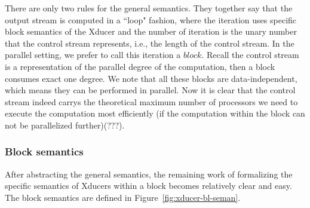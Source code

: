 There are only two rules for the general semantics. 
They together say that the output stream is computed in a ``loop" fashion, where the 
iteration uses specific block semantics of the Xducer and the number of iteration is the unary number that the control stream represents, i.e., the length of the control stream. 
In the parallel setting, we prefer to call this iteration a $block$. 
Recall the control stream is a representation of the parallel degree of the computation, then a block consumes exact one degree. 
We note that all these blocks are data-independent, which means they can be performed in parallel. 
Now it is clear that the control stream indeed carrys the theoretical
maximum number of processors we need to execute the computation most efficiently (if the computation within the block can not be parallelized further)(???).



\subsubsection{Block semantics}
After abstracting the general semantics, the remaining work of formalizing the specific semantics of Xducers within a block becomes relatively clear and easy. The block semantics are defined in Figure~\ref{fig:xducer-bl-seman}. 




